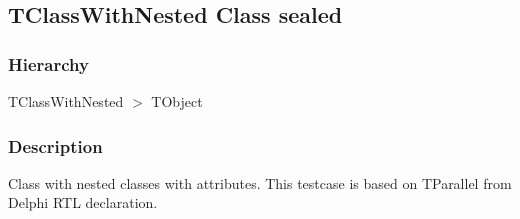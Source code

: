 \documentclass{report}
\begin{document}
\subsection*{TClassWithNested Class sealed}
\subsubsection*{\large{\textbf{Hierarchy}}\normalsize\hspace{1ex}\hfill}
TClassWithNested {$>$} TObject
\subsubsection*{\large{\textbf{Description}}\normalsize\hspace{1ex}\hfill}
Class with nested classes with attributes. This testcase is based on TParallel from Delphi RTL declaration.
\end{document}
